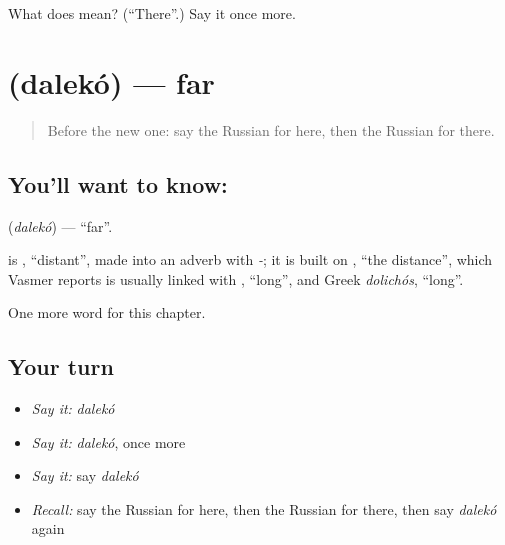 \begin{tcolorbox}[breakable,colback=teal!4,colframe=teal!35!black,title={Before you move on}]
What does  mean? (\textquotedblleft{}There\textquotedblright{}.) Say it once more.
\end{tcolorbox}
\section[\texorpdfstring{\ru{далеко} (dalekó)}{далеко (dalekó)}]{ (dalekó) — far}

\label{lesson:RU-C72-far}



\begin{quote}
Before the new one: say the Russian for here, then the Russian for there.
\end{quote}

\subsection*{You'll want to know: }
\textbf{} (\emph{dalekó}) — \textquotedblleft{}far\textquotedblright{}.

\begin{cousinweb}
\textbf{} is \emph{}, \textquotedblleft{}distant\textquotedblright{}, made into an adverb with \emph{-}; it is built on \emph{}, \textquotedblleft{}the distance\textquotedblright{}, which Vasmer reports is usually linked with \emph{}, \textquotedblleft{}long\textquotedblright{}, and Greek \emph{dolichós}, \textquotedblleft{}long\textquotedblright{}.
\end{cousinweb}

\begin{grammarlens}[title={What you've built}]
One more word for this chapter.
\end{grammarlens}

\subsection*{Your turn}
\begin{itemize}
\raggedright
  \item \emph{Say it:} \emph{dalekó}
  \item \emph{Say it:} \emph{dalekó}, once more
  \item \emph{Say it:} say \emph{dalekó}
  \item \emph{Recall:} say the Russian for here, then the Russian for there, then say \emph{dalekó} again
\end{itemize}

